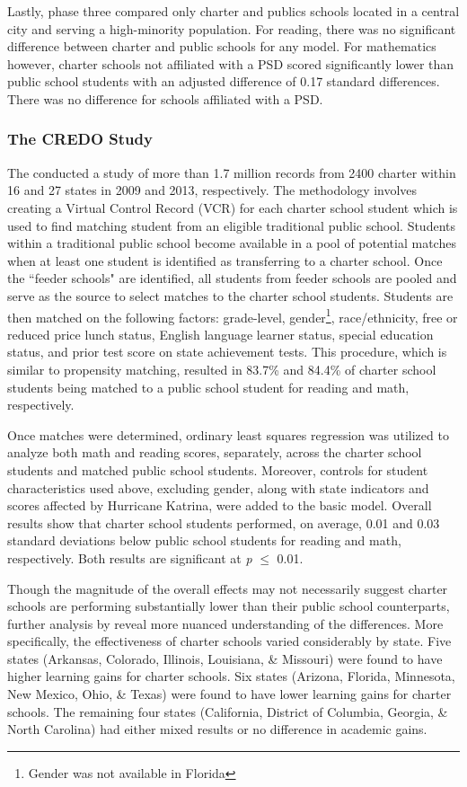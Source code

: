 \documentclass[letterpaper,12p,twoside]{article} %
\begin{document}
Lastly, phase three compared only charter and publics schools located in a central city and serving a high-minority population. For reading, there was no significant difference between charter and public schools for any model. For mathematics however, charter schools not affiliated with a PSD scored significantly lower than public school students with an adjusted difference of 0.17 standard differences. There was no difference for schools affiliated with a PSD.


\subsubsection{The CREDO Study}
The  conducted a study of more than 1.7 million records from 2400 charter within 16 and 27 states in 2009 and 2013, respectively. The methodology involves creating a Virtual Control Record (VCR) for each charter school student \cite<see also,>{AbadieDiamondHainueller2007,nea} which is used to find matching student from an eligible traditional public school. Students within a traditional public school become available in a pool of potential matches when at least one student is identified as transferring to a charter school. Once the ``feeder schools" are identified, all students from feeder schools are pooled and serve as the source to select matches to the charter school students. Students are then matched on the following factors: grade-level, gender\footnote{Gender was not available in Florida}, race/ethnicity, free or reduced price lunch status, English language learner status, special education status, and prior test score on state achievement tests. This procedure, which is similar to propensity matching, resulted in 83.7\% and 84.4\% of charter school students being matched to a public school student for reading and math, respectively.

Once matches were determined, ordinary least squares regression was utilized to analyze both math and reading scores, separately, across the charter school students and matched public school students. Moreover, controls for student characteristics used above, excluding gender, along with state indicators and scores affected by Hurricane Katrina, were added to the basic model. Overall results show that charter school students performed, on average, 0.01 and 0.03 standard deviations below public school students for reading and math, respectively. Both results are significant at \textit{p} $\leq$ 0.01.

Though the magnitude of the overall effects may not necessarily suggest charter schools are performing substantially lower than their public school counterparts, further analysis by  reveal more nuanced understanding of the differences. More specifically, the effectiveness of charter schools varied considerably by state. Five states (Arkansas, Colorado, Illinois, Louisiana, \& Missouri) were found to have higher learning gains for charter schools. Six states (Arizona, Florida, Minnesota, New Mexico, Ohio, \& Texas) were found to have lower learning gains for charter schools. The remaining four states (California, District of Columbia, Georgia, \& North Carolina) had either mixed results or no difference in academic gains. 
\end{document}
